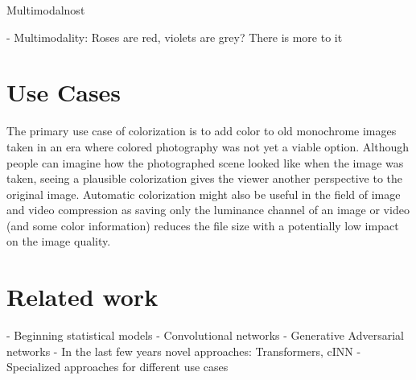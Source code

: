 Multimodalnost

- Multimodality:
    Roses are red, violets are grey?
    There is more to it

\begin{comment}

The task of image colorization can be defined as an image-to-image translation problem, where 
given a grayscale input image, the colorizer has to suggest a plausible colored version 
of the same image. The input to the colorizer is a 2-dimensional array 
where the intensity of each pixel is a one-dimensional 
value (usually in the 8-bit range), whereas the output, is a colored image that 
requires at least three channels to cover the whole color spectrum. 

The process of colorization can be written down as:
    \[\mathbf{Y} = \mathcal{F}(\mathbf{X})\]
where $\mathbf{X} \in \mathbb{R}^{H \times W \times 1}$ is the input grayscale image, 
$\mathbf{Y} \in \mathbb{R}^{H \times W \times 3}$ is the colored output and
$\mathcal{F}$ is the function that maps $\mathbf{X} \rightarrow \mathbf{Y}$. 
In the case of colorization $\mathcal{F}$ represents the colorizer.

\end{comment}


\section{Use Cases}

The primary use case of colorization is to add color to old monochrome images taken
in an era where colored photography was not yet a viable option. Although people 
can imagine how the photographed scene looked like when the image was taken, seeing 
a plausible colorization gives the viewer another perspective to the original image.
Automatic colorization might also be useful in the field of image\citep{fatima2021image} 
and video \citep{pan2019video} compression as saving only the luminance channel 
of an image or video (and some color information) reduces the file size with a potentially
low impact on the image quality. 


\section{Related work}

- Beginning statistical models
- Convolutional networks
- Generative Adversarial networks
- In the last few years novel approaches: Transformers, cINN
- Specialized approaches for different use cases